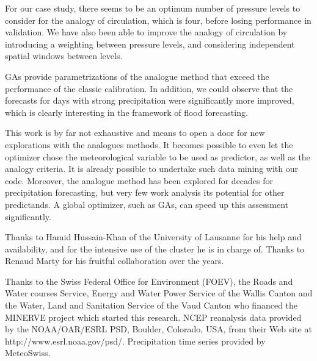 \documentclass{ametsoc}
\begin{document}
For our case study, there seems to be an optimum number of pressure levels to consider for the analogy of circulation, which is four, before losing performance in validation. We have also been able to improve the analogy of circulation by introducing a weighting between pressure levels, and considering independent spatial windows between levels.

GAs provide parametrizations of the analogue method that exceed the performance of the classic calibration. In addition, we could observe that the forecasts for days with strong precipitation were significantly more improved, which is clearly interesting in the framework of flood forecasting.

This work is by far not exhaustive and means to open a door for new explorations with the analogues methods. It becomes possible to even let the optimizer chose the meteorological variable to be used as predictor, as well as the analogy criteria. It is already possible to undertake such data mining with our code. Moreover, the analogue method has been explored for decades for precipitation forecasting, but very few work analysis its potential for other predictands. A global optimizer, such as GAs, can speed up this assessment significantly.




%
\acknowledgments
Thanks to Hamid Hussain-Khan of the University of Lausanne for his help and availability, and for the intensive use of the cluster he is in charge of. Thanks to Renaud Marty for his fruitful collaboration over the years.

Thanks to the Swiss Federal Office for Environment (FOEV), the Roads and Water courses Service, Energy and Water Power Service of the Wallis Canton and the Water, Land and Sanitation Service of the Vaud Canton who financed the MINERVE project which started this research. NCEP reanalysis data provided by the NOAA/OAR/ESRL PSD, Boulder, Colorado, USA, from their Web site at http://www.esrl.noaa.gov/psd/. Precipitation time series provided by MeteoSwiss. 


%

\end{document}
